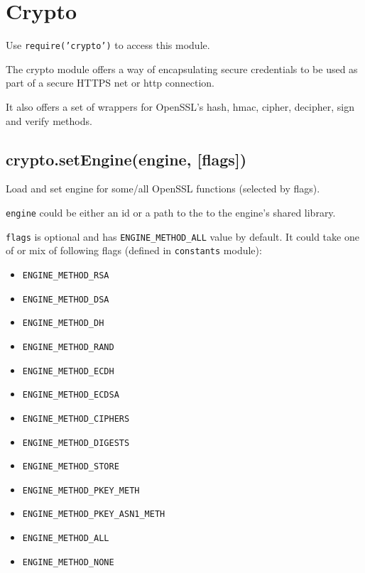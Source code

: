\section{Crypto}\label{crypto}

\begin{Shaded}
\begin{Highlighting}[]
 
     
\end{Highlighting}
\end{Shaded}

Use \texttt{require('crypto')} to access this module.

The crypto module offers a way of encapsulating secure credentials to be
used as part of a secure HTTPS net or http connection.

It also offers a set of wrappers for OpenSSL's hash, hmac, cipher,
decipher, sign and verify methods.

\subsection{crypto.setEngine(engine,
{[}flags{]})}\label{crypto.setengineengine-flags}

Load and set engine for some/all OpenSSL functions (selected by flags).

\texttt{engine} could be either an id or a path to the to the engine's
shared library.

\texttt{flags} is optional and has \texttt{ENGINE\_METHOD\_ALL} value by
default. It could take one of or mix of following flags (defined in
\texttt{constants} module):

\begin{itemize}
\itemsep1pt\parskip0pt
\item
  \texttt{ENGINE\_METHOD\_RSA}
\item
  \texttt{ENGINE\_METHOD\_DSA}
\item
  \texttt{ENGINE\_METHOD\_DH}
\item
  \texttt{ENGINE\_METHOD\_RAND}
\item
  \texttt{ENGINE\_METHOD\_ECDH}
\item
  \texttt{ENGINE\_METHOD\_ECDSA}
\item
  \texttt{ENGINE\_METHOD\_CIPHERS}
\item
  \texttt{ENGINE\_METHOD\_DIGESTS}
\item
  \texttt{ENGINE\_METHOD\_STORE}
\item
  \texttt{ENGINE\_METHOD\_PKEY\_METH}
\item
  \texttt{ENGINE\_METHOD\_PKEY\_ASN1\_METH}
\item
  \texttt{ENGINE\_METHOD\_ALL}
\item
  \texttt{ENGINE\_METHOD\_NONE}
\end{itemize}

